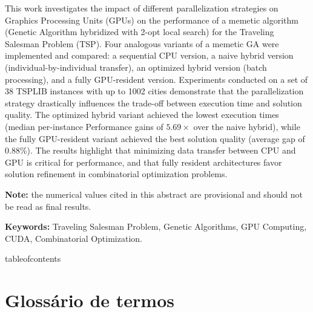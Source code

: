 This work investigates the impact of different parallelization strategies on Graphics Processing Units (GPUs) on the performance of a memetic algorithm (Genetic Algorithm hybridized with 2-opt local search) for the Traveling Salesman Problem (TSP).
Four analogous variants of a memetic GA were implemented and compared: a sequential CPU version, a naive hybrid version (individual-by-individual transfer), an optimized hybrid version (batch processing), and a fully GPU-resident version.
Experiments conducted on a set of 38 TSPLIB instances with up to 1002 cities demonstrate that the parallelization strategy drastically influences the trade-off between execution time and solution quality.
The optimized hybrid variant achieved the lowest execution times (median per-instance Performance gains of \(5.69\times\) over the naive hybrid), while the fully GPU-resident variant achieved the best solution quality (average gap of \(0.88\%\)).
The results highlight that minimizing data transfer between CPU and GPU is critical for performance, and that fully resident architectures favor solution refinement in combinatorial optimization problems.

\textbf{Note:} the numerical values cited in this abstract are provisional and should not be read as final results.

\textbf{Keywords:} Traveling Salesman Problem, Genetic Algorithms, GPU
Computing, CUDA, Combinatorial Optimization.

\clearpage

\clearpage
\csname tableofcontents\endcsname
\clearpage

\section*{Glossário de termos}\label{glossario}

